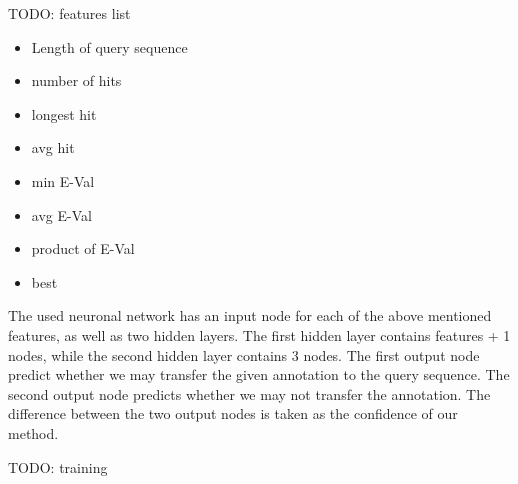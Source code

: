 TODO: features list\newline
\begin{itemize}
\item Length of query sequence
\item number of hits
\item longest hit
\item avg hit
\item min E-Val
\item avg E-Val
\item product of E-Val
\item best 

\end{itemize}
The used neuronal network has an input node for each of the above mentioned features, as well as two
hidden layers. The first hidden layer contains features + 1 nodes, while the second hidden layer
contains 3 nodes. The first output node predict whether we may transfer the given annotation to the 
query sequence. The second output node predicts whether we may not transfer the annotation.
The difference between the two output nodes is taken as the confidence of our method.


TODO: training

